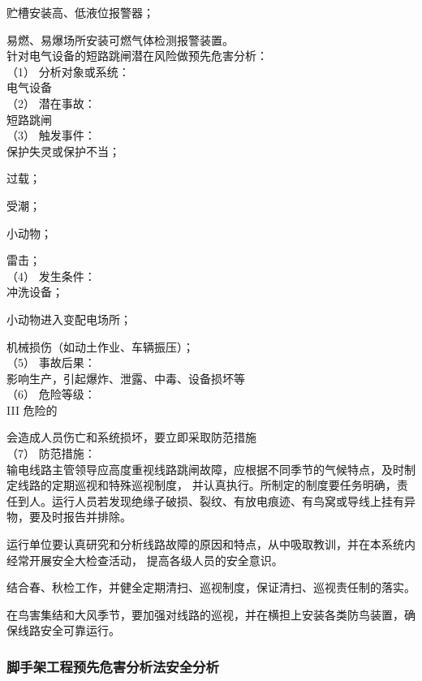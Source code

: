 贮槽安装高、低液位报警器；

易燃、易爆场所安装可燃气体检测报警装置。\\

针对电气设备的短路跳闸潜在风险做预先危害分析：\\

（1） 分析对象或系统：\\

电气设备\\

（2） 潜在事故：\\

短路跳闸\\

（3） 触发事件：\\

 保护失灵或保护不当；

 过载；

 受潮；

 小动物；

 雷击；\\

（4） 发生条件：\\

 冲洗设备；

 小动物进入变配电场所；

 机械损伤（如动土作业、车辆振压）；\\


（5） 事故后果：\\

影响生产，引起爆炸、泄露、中毒、设备损坏等\\

（6） 危险等级：\\

III 危险的

会造成人员伤亡和系统损坏，要立即采取防范措施\\

（7） 防范措施：\\

 输电线路主管领导应高度重视线路跳闸故障，应根据不同季节的气候特点，及时制定线路的定期巡视和特殊巡视制度，
并认真执行。所制定的制度要任务明确，责任到人。运行人员若发现绝缘子破损、裂纹、有放电痕迹、有鸟窝或导线上挂有异物，要及时报告并排除。 

 运行单位要认真研究和分析线路故障的原因和特点，从中吸取教训，并在本系统内经常开展安全大检查活动，
提高各级人员的安全意识。

 结合春、秋检工作，并健全定期清扫、巡视制度，保证清扫、巡视责任制的落实。

 在鸟害集结和大风季节，要加强对线路的巡视，并在横担上安装各类防鸟装置，确保线路安全可靠运行。

\subsubsection{脚手架工程预先危害分析法安全分析}
